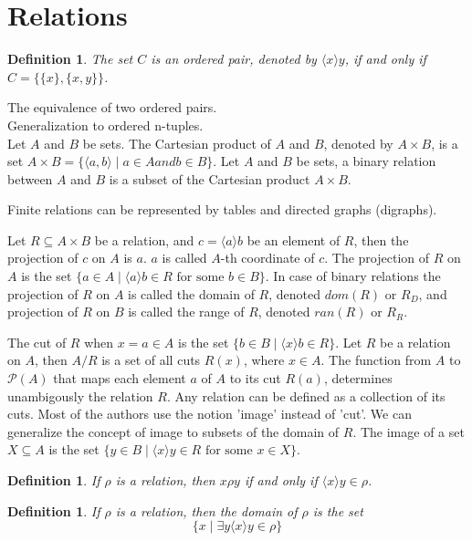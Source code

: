 \documentclass[letterpaper, 10pt]{article}
\newtheorem{define}[thm]{Definition}
\newcommand{\set}[1]{\{#1\}}
\newcommand{\tuple}[1]{\langle #1\rangle}
\begin{document}
	\section{Relations}

	\begin{define}
	The set $C$ is an ordered pair, denoted by $\tuple{x}{y}$,
	if and only if 
	$C = \set{\set{x},\set{x,y}}$.
	\end{define}

	The equivalence of two ordered pairs.\\
	Generalization to ordered n-tuples.\\

	Let $A$ and $B$ be sets. The Cartesian product of $A$ and $B$, denoted by
	$A\times B$, is a set $A\times B = \set{\tuple{a,b}\mid a\in A and b\in
	B}$.
	Let $A$ and $B$ be sets, a binary relation between $A$ and $B$ is a subset
	of the Cartesian product $A\times B$.

	Finite relations can be represented by tables and directed graphs
	(digraphs).

	Let $R\subseteq A\times B$ be a relation, and $c=\tuple{a}{b}$ be an element
	of $R$, then the projection of $c$ on $A$ is $a$. $a$ is called $A$-th
	coordinate of $c$. The projection of $R$ on $A$ is the set $\set{a\in A\mid
	\tuple{a}{b}\in R \text{ for some } b\in B}$.
	In case of binary relations the projection of $R$ on $A$ is called the
	domain of $R$, denoted $dom(R)$ or $R_D$, and projection of $R$ on $B$ is
	called the range of $R$, denoted $ran(R)$ or $R_R$.

	The cut of $R$ when $x=a\in A$ is the set $\set{b\in B\mid \tuple{x}{b} \in
	R}$.
	Let $R$ be a relation on $A$, then $A/R$ is a set of all cuts $R(x)$, where
	$x\in A$. The function from $A$ to $\mathcal{P}(A)$ that maps each element
	$a$ of $A$ to its cut $R(a)$, determines unambigously the relation $R$. Any
	relation can be defined as a collection of its cuts. Most of the authors use
	the notion 'image' instead of 'cut'. We can generalize the concept of image
	to subsets of the domain of $R$. The image of a set $X\subseteq A$ is the
	set $\set{y\in B\mid \tuple{x}{y} \in R \text{ for some } x\in X}$.

	\begin{define}
	If $\rho$ is a relation, then $x\rho y$ if and only if $\tuple{x}{y} \in
	\rho$.
	\end{define}

	\begin{define}
	If $\rho$ is a relation, then the domain of $\rho$ is the set
	$$
	\set{x \mid \exists y \tuple{x}{y} \in \rho}
	$$
	\end{define}
\end{document}
